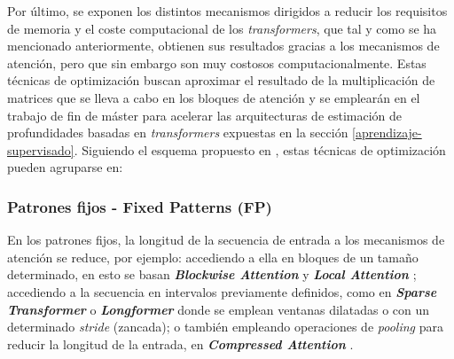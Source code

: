 \documentclass[a4paper, 11pt]{article}
\newcommand{\textbfit}[1]{\textbf{\textit{#1}}}
\begin{document}

Por último, se exponen los distintos mecanismos dirigidos a reducir los requisitos de memoria y el coste computacional de los \textit{transformers}, que tal y como se ha mencionado anteriormente, obtienen sus resultados gracias a los mecanismos de atención, pero que sin embargo son muy costosos computacionalmente. Estas técnicas de optimización buscan aproximar el resultado de la multiplicación de matrices que se lleva a cabo en los bloques de atención y se emplearán en el trabajo de fin de máster para acelerar las arquitecturas de estimación de profundidades basadas en \textit{transformers} expuestas en la sección \ref{aprendizaje-supervisado}. Siguiendo el esquema propuesto en \cite{2020arXiv200906732T}, estas técnicas de optimización pueden agruparse en:

\subsubsection{Patrones fijos - Fixed Patterns (FP)}
En los patrones fijos, la longitud de la secuencia de entrada a los mecanismos de atención se reduce, por ejemplo: accediendo a ella en bloques de un tamaño determinado, en esto se basan \textbfit{Blockwise Attention} \cite{qiu-etal-2020-blockwise} y \textbfit{Local Attention} \cite{localattention}; accediendo a la secuencia en intervalos previamente definidos, como en \textbfit{Sparse Transformer} \cite{sparse-transformers} o \textbfit{Longformer} \cite{beltagy2020longformer} donde se emplean ventanas dilatadas o con un determinado \textit{stride} (zancada); o también empleando operaciones de \textit{pooling} para reducir la longitud de la entrada, en \textbfit{Compressed Attention} \cite{j.2018generating}.

\end{document}
